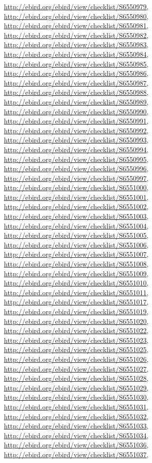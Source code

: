 \documentclass[9pt, article]{memoir}
\begin{document}
\begin{multicols}{2}
\url{http://ebird.org/ebird/view/checklist/S6550979}, 
\url{http://ebird.org/ebird/view/checklist/S6550980}, 
\url{http://ebird.org/ebird/view/checklist/S6550981}, 
\url{http://ebird.org/ebird/view/checklist/S6550982}, 
\url{http://ebird.org/ebird/view/checklist/S6550983}, 
\url{http://ebird.org/ebird/view/checklist/S6550984}, 
\url{http://ebird.org/ebird/view/checklist/S6550985}, 
\url{http://ebird.org/ebird/view/checklist/S6550986}, 
\url{http://ebird.org/ebird/view/checklist/S6550987}, 
\url{http://ebird.org/ebird/view/checklist/S6550988}, 
\url{http://ebird.org/ebird/view/checklist/S6550989}, 
\url{http://ebird.org/ebird/view/checklist/S6550990}, 
\url{http://ebird.org/ebird/view/checklist/S6550991}, 
\url{http://ebird.org/ebird/view/checklist/S6550992}, 
\url{http://ebird.org/ebird/view/checklist/S6550993}, 
\url{http://ebird.org/ebird/view/checklist/S6550994}, 
\url{http://ebird.org/ebird/view/checklist/S6550995}, 
\url{http://ebird.org/ebird/view/checklist/S6550996}, 
\url{http://ebird.org/ebird/view/checklist/S6550997}, 
\url{http://ebird.org/ebird/view/checklist/S6551000}, 
\url{http://ebird.org/ebird/view/checklist/S6551001}, 
\url{http://ebird.org/ebird/view/checklist/S6551002}, 
\url{http://ebird.org/ebird/view/checklist/S6551003}, 
\url{http://ebird.org/ebird/view/checklist/S6551004}, 
\url{http://ebird.org/ebird/view/checklist/S6551005}, 
\url{http://ebird.org/ebird/view/checklist/S6551006}, 
\url{http://ebird.org/ebird/view/checklist/S6551007}, 
\url{http://ebird.org/ebird/view/checklist/S6551008}, 
\url{http://ebird.org/ebird/view/checklist/S6551009}, 
\url{http://ebird.org/ebird/view/checklist/S6551010}, 
\url{http://ebird.org/ebird/view/checklist/S6551011}, 
\url{http://ebird.org/ebird/view/checklist/S6551017}, 
\url{http://ebird.org/ebird/view/checklist/S6551019}, 
\url{http://ebird.org/ebird/view/checklist/S6551020}, 
\url{http://ebird.org/ebird/view/checklist/S6551022}, 
\url{http://ebird.org/ebird/view/checklist/S6551023}, 
\url{http://ebird.org/ebird/view/checklist/S6551025}, 
\url{http://ebird.org/ebird/view/checklist/S6551026}, 
\url{http://ebird.org/ebird/view/checklist/S6551027}, 
\url{http://ebird.org/ebird/view/checklist/S6551028}, 
\url{http://ebird.org/ebird/view/checklist/S6551029}, 
\url{http://ebird.org/ebird/view/checklist/S6551030}, 
\url{http://ebird.org/ebird/view/checklist/S6551031}, 
\url{http://ebird.org/ebird/view/checklist/S6551032}, 
\url{http://ebird.org/ebird/view/checklist/S6551033}, 
\url{http://ebird.org/ebird/view/checklist/S6551034}, 
\url{http://ebird.org/ebird/view/checklist/S6551036}, 
\url{http://ebird.org/ebird/view/checklist/S6551037}, 

\end{multicols}
\end{document}
